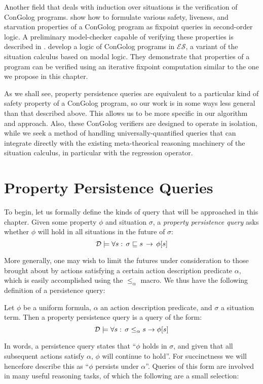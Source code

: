 Another field that deals with induction over situations is the verification
of ConGolog programs. \citet{ternovska97congolog_fixpoint} show how
to formulate various safety, liveness, and starvation properties of
a ConGolog program as fixpoint queries in second-order logic. A preliminary
model-checker capable of verifying these properties is described in
\citep{ternovska02congolog_model_checker}. \citet{classen08golog_properties}
develop a logic of ConGolog programs in $\mathcal{ES}$, a variant
of the situation calculus based on modal logic. They demonstrate that
properties of a program can be verified using an iterative fixpoint
computation similar to the one we propose in this chapter.

As we shall see, property persistence queries are equivalent to a
particular kind of safety property of a ConGolog program, so our work
is in some ways less general than that described above. This allows
us to be more specific in our algorithm and approach. Also, these
ConGolog verifiers are designed to operate in isolation, while we
seek a method of handling universally-quantified queries that can
integrate directly with the existing meta-theorical reasoning machinery
of the situation calculus, in particular with the regression operator.


\section{Property Persistence Queries\label{sec:Persistence:Definitions}}

To begin, let us formally define the kinds of query that will be approached
in this chapter. Given some property $\phi$ and situation $\sigma$,
a \emph{property persistence query} asks whether $\phi$ will hold
in all situations in the future of $\sigma$: \[
\mathcal{D}\models\forall s:\,\sigma\sqsubseteq s\,\rightarrow\,\phi[s]\]


More generally, one may wish to limit the futures under consideration
to those brought about by actions satisfying a certain action description
predicate $\alpha$, which is easily accomplished using the $\leq_{\alpha}$
macro. We thus have the following definition of a persistence query:

\begin{defnL}
 Let $\phi$ be a uniform
formula, $\alpha$ an action description predicate, and $\sigma$
a situation term. Then a property persistence query is a query of
the form:\[
\mathcal{D}\models\forall s:\,\sigma\le_{\alpha}s\rightarrow\phi[s]\]

\end{defnL}
In words, a persistence query states that {}``$\phi$ holds in $\sigma$,
and given that all subsequent actions satisfy $\alpha$, $\phi$ will
continue to hold''. For succinctness we will hencefore describe this
as {}``$\phi$ persists under $\alpha$''. Queries of this form
are involved in many useful reasoning tasks, of which the following
are a small selection:\\


